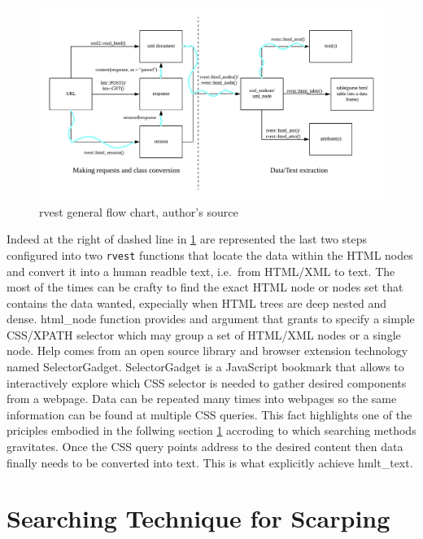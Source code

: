 \documentclass[
  12pt,
  a4paper,
  oneside]{book}
\theoremstyle{definition}
\theoremstyle{definition}
\theoremstyle{definition}
\theoremstyle{remark}
\begin{document}
\begin{figure}
\centering
\includegraphics{images/workflow.png}
\caption{\label{fig:rvestflowchart}rvest general flow chart, author's source}
\end{figure}

Indeed at the right of dashed line in \ref{fig:rvestflowchart} are represented the last two steps configured into two \texttt{rvest}\citep{rvest} functions that locate the data within the HTML nodes and convert it into a human readble text, i.e.~from HTML/XML to text. The most of the times can be crafty to find the exact HTML node or nodes set that contains the data wanted, expecially when HTML trees are deep nested and dense. html\_node function provides and argument that grants to specify a simple CSS/XPATH selector which may group a set of HTML/XML nodes or a single node. Help comes from an open source library and browser extension technology named SelectorGadget. SelectorGadget \citep{Selectorgadgetwhich} is a JavaScript bookmark that allows to interactively explore which CSS selector is needed to gather desired components from a webpage. Data can be repeated many times into webpages so the same information can be found at multiple CSS queries. This fact highlights one of the priciples embodied in the follwing section \ref{ProperScraping} accroding to which searching methods gravitates. Once the CSS query points address to the desired content then data finally needs to be converted into text. This is what explicitly achieve hmlt\_text.

\hypertarget{ProperScraping}{%
\section{Searching Technique for Scarping}\label{ProperScraping}}
\end{document}
